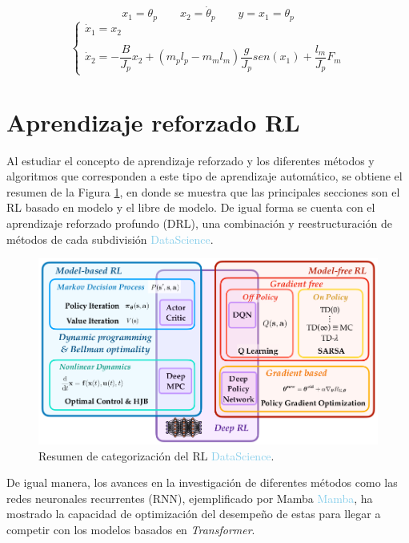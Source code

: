 \[x_1 = \theta_p \qquad x_2 = \dot{\theta}_p \qquad y = x_1 = \theta_p\]
\begin{equation}
	\left \{ \begin{array}{lcc} \dot{x}_1 = x_2 \\ \\ \dot{x}_2 = -\dfrac{B}{J_p} x_2 + (m_p l_p -m_m l_m)\dfrac{g}{J_p}sen(x_1) +\dfrac{l_m}{J_p}F_m \end{array} \right.
	\label{ecu:ecuestados}
\end{equation}




\section{Aprendizaje reforzado RL}


Al estudiar el concepto de aprendizaje reforzado y los diferentes métodos y algoritmos que corresponden a este tipo de aprendizaje automático, se obtiene el resumen de la Figura \ref{fig:teoriaRL}, en donde se muestra que las principales secciones son el RL basado en modelo y el libre de modelo. De igual forma se cuenta con el aprendizaje reforzado profundo (DRL), una combinación y reestructuración de métodos de cada subdivisión \textcolor{SkyBlue}{DataScience}.

\begin{figure}[hh]
	\centering
	\includegraphics[scale=0.35]{fig/new/CatRL.png}
	\caption{Resumen de categorización del RL \textcolor{SkyBlue}{DataScience}.}
	\label{fig:teoriaRL}
\end{figure}


De igual manera, los avances en la investigación de diferentes métodos como las redes neuronales recurrentes (RNN), ejemplificado por Mamba \textcolor{SkyBlue}{Mamba}, ha mostrado la capacidad de optimización del desempeño de estas para llegar a competir con los modelos basados en \textit{Transformer}.



